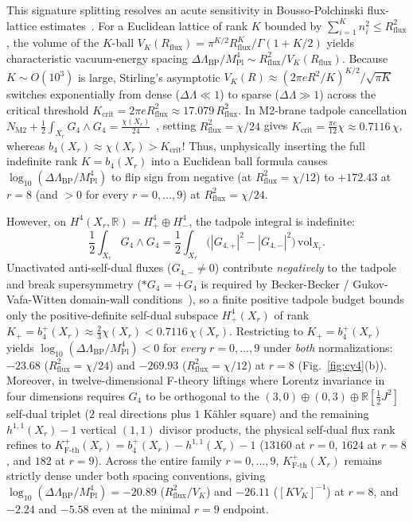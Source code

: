 \documentclass[aps,prd,twocolumn,nofootinbib,floatfix]{revtex4-2}
\begin{document}
This signature splitting resolves an acute sensitivity in Bousso-Polchinski flux-lattice estimates~\cite{BoussoPolchinski2000}.
For a Euclidean lattice of rank $K$ bounded by $\sum_{i=1}^K n_i^2 \le R_{\mathrm{flux}}^2$, the volume of the $K$-ball $V_K(R_{\mathrm{flux}}) = \pi^{K/2} R_{\mathrm{flux}}^K / \Gamma(1 + K/2)$ yields characteristic vacuum-energy spacing $\Delta\Lambda_{\mathrm{BP}}/M_{\mathrm{Pl}}^4 \sim R_{\mathrm{flux}}^2 / V_K(R_{\mathrm{flux}})$.
Because $K \sim O(10^3)$ is large, Stirling's asymptotic $V_K(R) \approx (2\pi e R^2 / K)^{K/2} / \sqrt{\pi K}$ switches exponentially from dense ($\Delta\Lambda \ll 1$) to sparse ($\Delta\Lambda \gg 1$) across the critical threshold $K_{\mathrm{crit}} = 2\pi e R_{\mathrm{flux}}^2 \approx 17.079\,R_{\mathrm{flux}}^2$.
In M2-brane tadpole cancellation $N_{\mathrm{M2}} + \frac{1}{2}\int_{X_r} G_4 \wedge G_4 = \frac{\chi(X_r)}{24}$~\cite{GukovVafaWitten2000}, setting $R_{\mathrm{flux}}^2 = \chi/24$ gives $K_{\mathrm{crit}} = \frac{\pi e}{12}\chi \approx 0.7116\,\chi$, whereas $b_4(X_r) \approx \chi(X_r) > K_{\mathrm{crit}}$!
Thus, unphysically inserting the full indefinite rank $K = b_4(X_r)$ into a Euclidean ball formula causes $\log_{10}(\Delta\Lambda_{\mathrm{BP}}/M_{\mathrm{Pl}}^4)$ to flip sign from negative (at $R_{\mathrm{flux}}^2 = \chi/12$) to $+172.43$ at $r = 8$ (and $> 0$ for every $r = 0,\dots,9$) at $R_{\mathrm{flux}}^2 = \chi/24$.

However, on $H^4(X_r,\mathbb{R}) = H^4_+ \oplus H^4_-$, the tadpole integral is indefinite:
\begin{equation}
\label{eq:gvw_indefinite}
\frac{1}{2}\int_{X_r} G_4 \wedge G_4 = \frac{1}{2}\int_{X_r} \bigl(|G_{4,+}|^2 - |G_{4,-}|^2\bigr)\,\mathrm{vol}_{X_r}.
\end{equation}
Unactivated anti-self-dual fluxes ($G_{4,-} \ne 0$) contribute \emph{negatively} to the tadpole and break supersymmetry ($*G_4 = +G_4$ is required by Becker-Becker / Gukov-Vafa-Witten domain-wall conditions~\cite{GukovVafaWitten2000}), so a finite positive tadpole budget bounds only the positive-definite self-dual subspace $H^4_+(X_r)$ of rank $K_+ = b_4^+(X_r) \approx \frac{2}{3}\chi(X_r) < 0.7116\,\chi(X_r)$.
Restricting to $K_+ = b_4^+(X_r)$ yields $\log_{10}(\Delta\Lambda_{\mathrm{BP}}/M_{\mathrm{Pl}}^4) < 0$ for \emph{every} $r = 0,\dots,9$ under \emph{both} normalizations: $-23.68$ ($R_{\mathrm{flux}}^2 = \chi/24$) and $-269.93$ ($R_{\mathrm{flux}}^2 = \chi/12$) at $r = 8$ (Fig.~\ref{fig:cy4}(b)).
Moreover, in twelve-dimensional F-theory liftings where Lorentz invariance in four dimensions requires $G_4$ to be orthogonal to the $(3,0)\oplus(0,3)\oplus\mathbb{R}[\frac{1}{2}J^2]$ self-dual triplet ($2$ real directions plus $1$ K\"ahler square) and the remaining $h^{1,1}(X_r) - 1$ vertical $(1,1)$ divisor products, the physical self-dual flux rank refines to $K_{\mathrm{F\text{-}th}}^+(X_r) = b_4^+(X_r) - h^{1,1}(X_r) - 1$ ($13160$ at $r = 0$, $1624$ at $r = 8$, and $182$ at $r = 9$).
Across the entire family $r = 0,\dots,9$, $K_{\mathrm{F\text{-}th}}^+(X_r)$ remains strictly dense under both spacing conventions, giving $\log_{10}(\Delta\Lambda_{\mathrm{BP}}/M_{\mathrm{Pl}}^4) = -20.89$ ($R_{\mathrm{flux}}^2/V_K$) and $-26.11$ ($[K V_K]^{-1}$) at $r = 8$, and $-2.24$ and $-5.58$ even at the minimal $r = 9$ endpoint.
\end{document}
